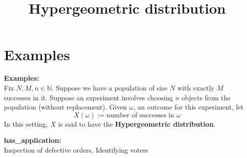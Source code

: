 \documentclass{article}
\title{Hypergeometric distribution}
\begin{document}
\maketitle

\section{Examples}

\textbf{Examples:} \\
Fix \( N, M, n \in \mathbb{N} \). Suppose we have a population of size \( N \) with exactly \( M \) successes in it. Suppose an experiment involves choosing \( n \) objects from the population (without replacement). Given \( \omega \), an outcome for this experiment, let
\[
X(\omega) := \text{number of successes in } \omega
\]
In this setting, \( X \) is said to have the \textbf{Hypergeometric distribution}.


\textbf{has\_application:} \\
Inspection of defective orders, Identifying voters
\end{document}
